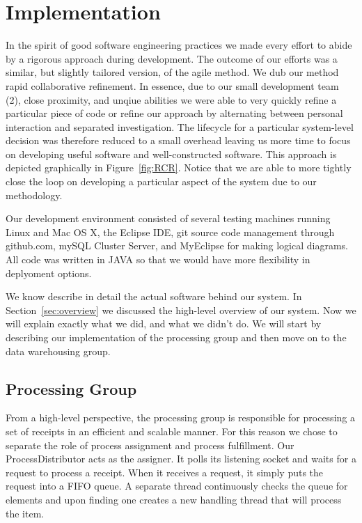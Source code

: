 \section{Implementation}
\label{sec:implementation}

In the spirit of good software engineering practices we made every
effort to abide by a rigorous approach during development. The outcome
of our efforts was a similar, but slightly tailored version, of the
agile method. We dub our method rapid collaborative refinement. In
essence, due to our small development team (2), close proximity, and
unqiue abilities we were able to very quickly refine a particular
piece of code or refine our approach by alternating between personal
interaction and separated investigation. The lifecycle for a
particular system-level decision was therefore reduced to a small
overhead leaving us more time to focus on developing useful software
and well-constructed software. This approach is depicted graphically
in Figure~\ref{fig:RCR}. Notice that we are able to more tightly close
the loop on developing a particular aspect of the system due to our
methodology.

Our development environment consisted of several testing machines
running Linux and Mac OS X, the Eclipse IDE, git source code
management through github.com, mySQL Cluster Server, and MyEclipse for
making logical diagrams. All code was written in JAVA so that we
would have more flexibility in deplyoment options.

We know describe in detail the actual software behind our system. In
Section~\ref{sec:overview} we discussed the high-level overview of our
system. Now we will explain exactly what we did, and what we didn't
do. We will start by describing our implementation of the processing
group and then move on to the data warehousing group.

\subsection{Processing Group}
\label{implementation.processing}

From a high-level perspective, the processing group is responsible for
processing a set of receipts in an efficient and scalable manner. For
this reason we chose to separate the role of process assignment and
process fulfillment. Our ProcessDistributor acts as the assigner. It
polls its listening socket and waits for a request to process a
receipt. When it receives a request, it simply puts the request into a
FIFO queue. A separate thread continuously checks the queue for
elements and upon finding one creates a new handling thread that will
process the item.


